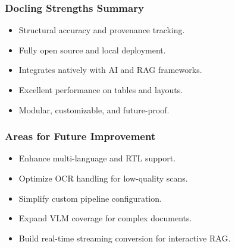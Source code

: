 \begin{frame}[fragile]\frametitle{Docling Strengths Summary}
      \begin{itemize}
        \item Structural accuracy and provenance tracking.
        \item Fully open source and local deployment.
        \item Integrates natively with AI and RAG frameworks.
        \item Excellent performance on tables and layouts.
        \item Modular, customizable, and future-proof.
      \end{itemize}
\end{frame}

\begin{frame}[fragile]\frametitle{Areas for Future Improvement}
      \begin{itemize}
        \item Enhance multi-language and RTL support.
        \item Optimize OCR handling for low-quality scans.
        \item Simplify custom pipeline configuration.
        \item Expand VLM coverage for complex documents.
        \item Build real-time streaming conversion for interactive RAG.
      \end{itemize}
\end{frame}

